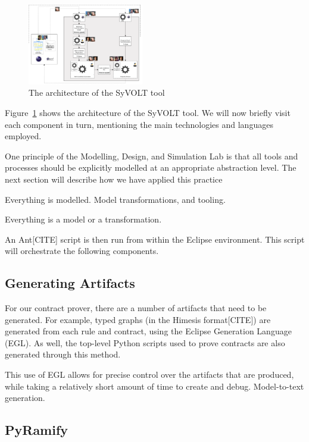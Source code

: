 \begin{figure}
\centering
\includegraphics[width=0.45\textwidth]{figures/syvolt_arch}
\caption{The architecture of the SyVOLT tool}
\label{fig:arch}
\end{figure}

Figure~\ref{fig:arch} shows the architecture of the SyVOLT tool. We will now briefly visit each component in turn, mentioning the main technologies and languages employed.


One principle of the Modelling, Design, and Simulation Lab is that all tools and processes should be explicitly modelled at an appropriate abstraction level. The next section will describe how we have applied this practice 

Everything is modelled. Model transformations, and tooling.

Everything is a model or a transformation.



An Ant[CITE] script is then run from within the Eclipse environment. This script will orchestrate the following components.


\subsection{Generating Artifacts}
For our contract prover, there are a number of artifacts that need to be generated. For example, typed graphs (in the Himesis format[CITE]) are generated from each rule and contract, using the Eclipse Generation Language (EGL). As well, the top-level Python scripts used to prove contracts are also generated through this method.

This use of EGL allows for precise control over the artifacts that are produced, while taking a relatively short amount of time to create and debug.
Model-to-text generation.



\subsection{PyRamify}

